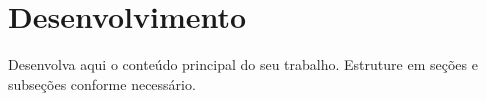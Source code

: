 \chapter{Desenvolvimento}
\label{cap:desenvolvimento}

Desenvolva aqui o conteúdo principal do seu trabalho. Estruture em seções e subseções conforme necessário.